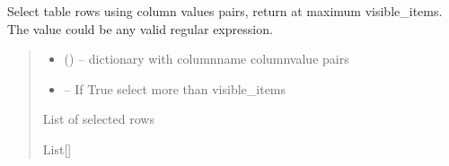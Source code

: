 \documentclass[letterpaper,10pt,english]{sphinxmanual}
\begin{document}
\begin{savenotes}
\begin{fulllineitems}
\begin{savenotes}
\begin{fulllineitems}
\end{fulllineitems}\end{savenotes}


\begin{savenotes}\begin{fulllineitems}
\label{\detokenize{eezz:eezz.table.TTable.do_select}}
\pysigstartsignatures
{}
\pysigstopsignatures
\sphinxAtStartPar
Select table rows using column values pairs, return at maximum visible\_items.
The value could be any valid regular expression.
\begin{quote}\begin{description}
\begin{itemize}
\item {} 
\sphinxAtStartPar
{} (\sphinxstyleliteralemphasis{\sphinxupquote{{[}}}\sphinxstyleliteralemphasis{\sphinxupquote{, }}\sphinxstyleliteralemphasis{\sphinxupquote{{]}}}) – dictionary with column\sphinxhyphen{}name \sphinxhyphen{} column\sphinxhyphen{}value pairs

\item {} 
\sphinxAtStartPar
{} – If True select more than visible\_items

\end{itemize}

\sphinxAtStartPar
List of selected rows

\sphinxAtStartPar
List{[}{\hyperref[\detokenize{eezz:eezz.table.TTableRow}]{}}{]}


\end{description}
\end{quote}
\end{fulllineitems}
\end{savenotes}
\end{fulllineitems}
\end{savenotes}
\end{document}
